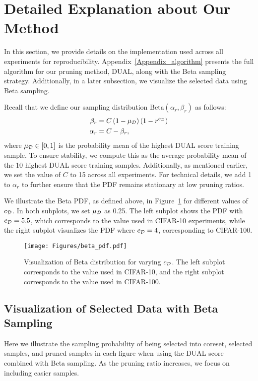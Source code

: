 \section{Detailed Explanation about Our Method}
\label{Appendix_explanation_of_dual_pruning}

In this section, we provide details on the implementation used across all experiments for reproducibility. Appendix~\ref{Appendix_algorithm} presents the full algorithm for our pruning method, DUAL, along with the Beta sampling strategy. Additionally, in a later subsection, we visualize the selected data using Beta sampling.

Recall that we define our sampling distribution $\mathrm{Beta}(\alpha_r, \beta_r)$ as follows:
\begin{align}
\label{eq:alpha_beta_detail}
\begin{split}
    \beta_r &= C\left(1-\mu_{\mathcal{D}}\right)\left(1-r^{c_{\mathcal{D}}}\right)\\
    \alpha_r &= C-\beta_r,
\end{split}
\end{align}
where $\mu_{\mathcal{D}}\in[0, 1]$ is the probability mean of the highest DUAL score training sample. To ensure stability, we compute this as the average probability mean of the 10 highest DUAL score training samples. Additionally, as mentioned earlier, we set the value of $C$ to 15 across all experiments. For technical details, we add 1 to $\alpha_r$ to further ensure that the PDF remains stationary at low pruning ratios.

We illustrate the Beta PDF, as defined above, in Figure~\ref{fig:beta_pdf} for different values of $c_{\mathcal{D}}$. In both subplots, we set $\mu_{\mathcal{D}}$ as 0.25. The left subplot shows the PDF with $c_{\mathcal{D}}=5.5$, which corresponds to the value used in CIFAR-10 experiments, while the right subplot visualizes the PDF where $c_{\mathcal{D}}=4$, corresponding to CIFAR-100.
\begin{figure}[ht]
    \centering
    \texttt{[image: Figures/beta\_pdf.pdf]}
    \caption{Visualization of Beta distribution for varying $c_{\mathcal{D}}$. The left subplot corresponds to the value used in CIFAR-10, and the right subplot corresponds to the value used in CIFAR-100.}
    \label{fig:beta_pdf}
\end{figure}

\clearpage
\subsection{Visualization of Selected Data with Beta Sampling}
\label{Appendix_coreset_visualization}
Here we illustrate the sampling probability of being selected into coreset, selected samples, and pruned samples in each figure when using the DUAL score combined with Beta sampling. As the pruning ratio increases, we focus on including easier samples.

